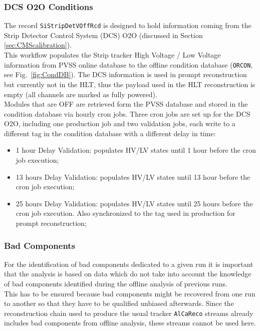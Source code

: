\subsubsection{DCS O2O Conditions}
The record \texttt{SiStripDetVOffRcd} is designed to hold information coming from the Strip Detector Control System (DCS) O2O (discussed in Section \ref{sec:CMScalibration}).\\ This workflow populates the Strip tracker High Voltage / Low Voltage information from PVSS online database to the offline condition database (\texttt{ORCON}, see Fig.~\ref{fig:CondDB}). The DCS information is used in prompt reconstruction but currently not in the HLT, thus the payload used in the HLT reconstruction is empty (all channels are marked as fully powered).\\
Modules that are OFF are retrieved form the PVSS database and stored in the condition database via hourly cron jobs. Three cron jobs are set up for the DCS O2O, including one production job and two validation jobs, each write to a different tag in the condition database with a different delay in time: 
\begin{itemize}
\item 1 hour Delay Validation: populates HV/LV states until 1 hour before the cron job execution;
\item 13 hours Delay Validation: populates HV/LV states until 13 hour before the cron job execution;
\item 25 hours Delay Validation: populates HV/LV states until 25 hours before the cron job execution. Also synchronized to the tag used in production for prompt reconstruction;
\end{itemize}

\subsubsection{Bad Components}
For the identification of bad components dedicated to a given run it is important that the analysis is based on data which do not take into account the knowledge of bad components identified during the offline analysis of previous runs.\\
This has to be ensured because bad components might be recovered from one run to another so that they have to be qualified unbiased afterwards. Since the reconstruction chain used to produce the usual tracker \texttt{AlCaReco} streams already includes bad components from offline analysis, these streams cannot be used here.

